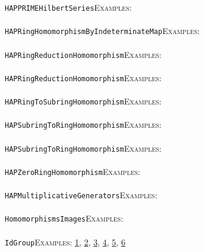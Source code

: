\documentclass[a4paper,11pt]{report}
\begin{document}
{{ \texttt{HAPPRIME{\textunderscore}HilbertSeries}{\nobreakspace}{\nobreakspace}{\nobreakspace}{\nobreakspace}\textsc{Examples:} \\
 \\
 \texttt{HAPRingHomomorphismByIndeterminateMap}{\nobreakspace}{\nobreakspace}{\nobreakspace}{\nobreakspace}\textsc{Examples:} \\
 \\
 \texttt{HAPRingReductionHomomorphism}{\nobreakspace}{\nobreakspace}{\nobreakspace}{\nobreakspace}\textsc{Examples:} \\
 \\
 \texttt{HAPRingReductionHomomorphism}{\nobreakspace}{\nobreakspace}{\nobreakspace}{\nobreakspace}\textsc{Examples:} \\
 \\
 \texttt{HAPRingToSubringHomomorphism}{\nobreakspace}{\nobreakspace}{\nobreakspace}{\nobreakspace}\textsc{Examples:} \\
 \\
 \texttt{HAPSubringToRingHomomorphism}{\nobreakspace}{\nobreakspace}{\nobreakspace}{\nobreakspace}\textsc{Examples:} \\
 \\
 \texttt{HAPSubringToRingHomomorphism}{\nobreakspace}{\nobreakspace}{\nobreakspace}{\nobreakspace}\textsc{Examples:} \\
 \\
 \texttt{HAPZeroRingHomomorphism}{\nobreakspace}{\nobreakspace}{\nobreakspace}{\nobreakspace}\textsc{Examples:} \\
 \\
 \texttt{HAP{\textunderscore}MultiplicativeGenerators}{\nobreakspace}{\nobreakspace}{\nobreakspace}{\nobreakspace}\textsc{Examples:} \\
 \\
 \texttt{HomomorphismsImages}{\nobreakspace}{\nobreakspace}{\nobreakspace}{\nobreakspace}\textsc{Examples:} \\
 \\
 \texttt{IdGroup}{\nobreakspace}{\nobreakspace}{\nobreakspace}{\nobreakspace}\textsc{Examples:} \href{tutorial/chap5.html} {1}{\nobreakspace}, \href{../www/SideLinks/About/aboutBogomolov.html} {2}{\nobreakspace}, \href{../www/SideLinks/About/aboutPersistent.html} {3}{\nobreakspace}, \href{../www/SideLinks/About/aboutQuandles.html} {4}{\nobreakspace}, \href{../www/SideLinks/About/aboutquasi.html} {5}{\nobreakspace}, \href{../www/SideLinks/About/aboutGouter.html} {6}{\nobreakspace} \\
 \\
}}
\end{document}
